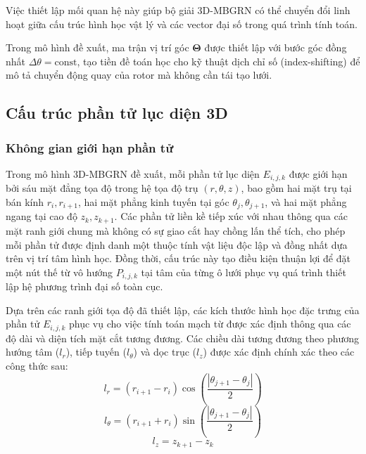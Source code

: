 Việc thiết lập mối quan hệ này giúp bộ giải 3D-MBGRN có thể chuyển đổi linh hoạt giữa cấu trúc hình học vật lý và các vector đại số trong quá trình tính toán.

Trong mô hình đề xuất, ma trận vị trí góc $\mathbf{\Theta}$ được thiết lập với bước góc đồng nhất $\Delta\theta = \text{const}$, tạo tiền đề toán học cho kỹ thuật dịch chỉ số (index-shifting) để mô tả chuyển động quay của rotor mà không cần tái tạo lưới.

\subsection{Cấu trúc phần tử lục diện 3D}

\subsubsection{Không gian giới hạn phần tử}
Trong mô hình 3D-MBGRN đề xuất, mỗi phần tử lục diện $E_{i,j,k}$ được giới hạn bởi sáu mặt đẳng tọa độ trong hệ tọa độ trụ $(r, \theta, z)$, bao gồm hai mặt trụ tại bán kính $r_i, r_{i+1}$, hai mặt phẳng kinh tuyến tại góc $\theta_j, \theta_{j+1}$, và hai mặt phẳng ngang tại cao độ $z_k, z_{k+1}$. Các phần tử liền kề tiếp xúc với nhau thông qua các mặt ranh giới chung mà không có sự giao cắt hay chồng lấn thể tích, cho phép mỗi phần tử được định danh một thuộc tính vật liệu độc lập và đồng nhất dựa trên vị trí tâm hình học. Đồng thời, cấu trúc này tạo điều kiện thuận lợi để đặt một nút thế từ vô hướng $P_{i,j,k}$ tại tâm của từng ô lưới phục vụ quá trình thiết lập hệ phương trình đại số toàn cục.

Dựa trên các ranh giới tọa độ đã thiết lập, các kích thước hình học đặc trưng của phần tử $E_{i,j,k}$ phục vụ cho việc tính toán mạch từ được xác định thông qua các độ dài và diện tích mặt cắt tương đương. Các chiều dài tương đương theo phương hướng tâm ($l_r$), tiếp tuyến ($l_\theta$) và dọc trục ($l_z$) được xác định chính xác theo các công thức sau:
\begin{equation}
    l_r = (r_{i+1} - r_i) \cos\left( \frac{|\theta_{j+1} - \theta_j|}{2} \right)
\end{equation}
\begin{equation}
    l_\theta = (r_{i+1} + r_i) \sin\left( \frac{|\theta_{j+1} - \theta_j|}{2} \right)
\end{equation}
\begin{equation}
    l_z = z_{k+1} - z_k
\end{equation}

